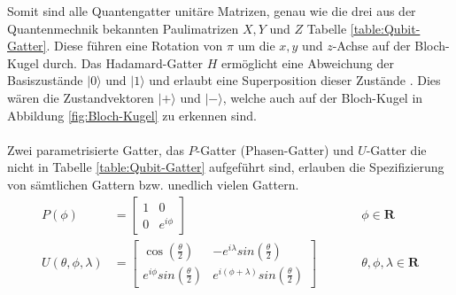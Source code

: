 Somit sind alle Quantengatter unit\"are Matrizen, genau wie die drei aus der Quantenmechnik bekannten Paulimatrizen $X, Y$ und $Z$ Tabelle \ref{table:Qubit-Gatter}. Diese f\"uhren eine Rotation von $\pi$ um die $x, y$ und $z$-Achse auf der Bloch-Kugel durch. Das Hadamard-Gatter $H$ erm\"oglicht eine Abweichung der Basiszust\"ande $|0\rangle$ und $|1\rangle$ und erlaubt eine Superposition dieser Zust\"ande \cite{Qiskit-Textbook}.
Dies w\"aren die Zustandvektoren $|+\rangle$ und $|-\rangle$, welche auch auf der Bloch-Kugel in Abbildung \ref{fig:Bloch-Kugel} zu erkennen sind. \\ \\
Zwei parametrisierte Gatter, das $P$-Gatter (Phasen-Gatter) und $U$-Gatter die nicht in Tabelle \ref{table:Qubit-Gatter} aufgef\"uhrt sind, erlauben die Spezifizierung von s\"amtlichen Gattern bzw. unedlich vielen Gattern.
\begin{equation}
\begin{aligned}
P(\phi) &= \begin{bmatrix}1 & 0 \\ 0 & e^{i\phi} \end{bmatrix} &&\qquad \phi \in \mathbf{R}\\[1em]
U(\theta, \phi, \lambda) &= \begin{bmatrix} \cos\left(\frac{\theta}{2}\right) & -e^{i\lambda}sin\left(\frac{\theta}{2}\right) \\
e^{i\phi}sin\left(\frac{\theta}{2}\right) & e^{i(\phi+\lambda)}sin\left(\frac{\theta}{2}\right)
\end{bmatrix} &&\qquad \theta, \phi, \lambda \in \mathbf{R}
\end{aligned}
\end{equation}

\vspace{1.2cm}

